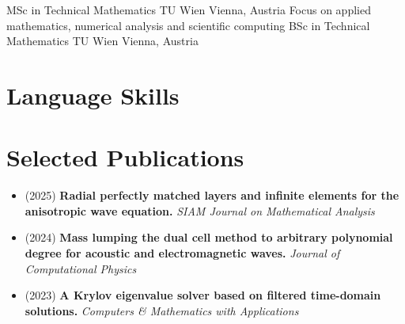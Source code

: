 \documentclass[11pt,a4paper]{moderncv}
\begin{document}
{MSc in Technical Mathematics}
{TU Wien}
{Vienna, Austria}
{}
{Focus on applied mathematics, numerical analysis and scientific computing}
{BSc in Technical Mathematics}
{TU Wien}
{Vienna, Austria}
{}
{}

\section{Language Skills}

\section{Selected Publications}

\begin{itemize}
  \item (2025) \textbf{ Radial perfectly matched layers and infinite elements for the anisotropic wave equation.} \emph{SIAM Journal on Mathematical Analysis}
  \item (2024) \textbf{Mass lumping the dual cell method to arbitrary polynomial degree for acoustic and electromagnetic waves.} \emph{Journal of Computational Physics}


  \item (2023) \textbf{A Krylov eigenvalue solver based on filtered time-domain solutions.} \emph{Computers \& Mathematics with Applications}
\end{itemize}

\vspace{0.4em}

\end{document}
